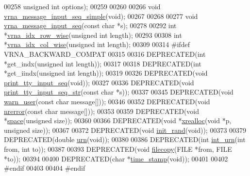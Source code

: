 \begin{DoxyCode}
00258                             \textcolor{keywordtype}{unsigned} \textcolor{keywordtype}{int} options);
00259 
00260 
00266 \textcolor{keywordtype}{void} \hyperlink{group__utils_gaee1dd652ca5b9e56b096963a1576f73b}{vrna\_message\_input\_seq\_simple}(\textcolor{keywordtype}{void});
00267 
00268 
00277 \textcolor{keywordtype}{void} \hyperlink{group__utils_gaf4d194d558b0c975f269de01dea52460}{vrna\_message\_input\_seq}(\textcolor{keyword}{const} \textcolor{keywordtype}{char} *s);
00278 
00292 \textcolor{keywordtype}{int} *\hyperlink{group__utils_ga70b180e9ea764218a82647a1cd347445}{vrna\_idx\_row\_wise}(\textcolor{keywordtype}{unsigned} \textcolor{keywordtype}{int} length);
00293 
00308 \textcolor{keywordtype}{int} *\hyperlink{group__utils_ga89ebc69c52fa0c78c9e1974b0017746b}{vrna\_idx\_col\_wise}(\textcolor{keywordtype}{unsigned} \textcolor{keywordtype}{int} length);
00309 
00314 \textcolor{preprocessor}{#ifdef  VRNA\_BACKWARD\_COMPAT}
00315 
00316 DEPRECATED(\textcolor{keywordtype}{int}   *get\_indx(\textcolor{keywordtype}{unsigned} \textcolor{keywordtype}{int} length));
00317 
00318 DEPRECATED(\textcolor{keywordtype}{int}   *get\_iindx(\textcolor{keywordtype}{unsigned} \textcolor{keywordtype}{int} length));
00319 
00326 DEPRECATED(\textcolor{keywordtype}{void} \hyperlink{utils_8h_a6bf778117d31b7fd90db435323f4ef74}{print\_tty\_input\_seq}(\textcolor{keywordtype}{void}));
00327 
00336 DEPRECATED(\textcolor{keywordtype}{void} \hyperlink{utils_8h_ae4ef89b662a3e9b5b5f0781d9757aba0}{print\_tty\_input\_seq\_str}(\textcolor{keyword}{const} \textcolor{keywordtype}{char} *s));
00337 
00345 DEPRECATED(\textcolor{keywordtype}{void} \hyperlink{utils_8h_af2355fa8746f2f30fbe71db65dea3d51}{warn\_user}(\textcolor{keyword}{const} \textcolor{keywordtype}{char} message[]));
00346 
00352 DEPRECATED(\textcolor{keywordtype}{void} \hyperlink{utils_8h_a127ce946e56b5a5773781cabe68e38c5}{nrerror}(\textcolor{keyword}{const} \textcolor{keywordtype}{char} message[]));
00353 
00359 DEPRECATED(\textcolor{keywordtype}{void} *\hyperlink{utils_8h_ad7e1e137b3bf1f7108933d302a7f0177}{space}(\textcolor{keywordtype}{unsigned} size));
00360 
00366 DEPRECATED(\textcolor{keywordtype}{void} *\hyperlink{utils_8h_a9037ada838835b1b9db41581a021b0c8}{xrealloc}(\textcolor{keywordtype}{void} *p, \textcolor{keywordtype}{unsigned} size));
00367 
00372 DEPRECATED(\textcolor{keywordtype}{void} \hyperlink{utils_8h_a8aaa6d9be6f803f496d9b97375c371f3}{init\_rand}(\textcolor{keywordtype}{void}));
00373 
00379 DEPRECATED(\textcolor{keywordtype}{double} \hyperlink{utils_8h_aaa328491c84996e445d027fde9800f2e}{urn}(\textcolor{keywordtype}{void}));
00380 
00386 DEPRECATED(\textcolor{keywordtype}{int} \hyperlink{utils_8h_a68ff0849d44f62fe491800378a5ffcb4}{int\_urn}(\textcolor{keywordtype}{int} from, \textcolor{keywordtype}{int} to));
00387 
00393 DEPRECATED(\textcolor{keywordtype}{void} \hyperlink{utils_8h_ab213334ce977b6d21611cdea6b80c3bf}{filecopy}(FILE *from, FILE *to));
00394 
00400 DEPRECATED(\textcolor{keywordtype}{char} *\hyperlink{utils_8h_a7afeb906cb36e9d77379eabc6907ac46}{time\_stamp}(\textcolor{keywordtype}{void}));
00401 
00402 \textcolor{preprocessor}{#endif}
00403 
00404 \textcolor{preprocessor}{#endif}
\end{DoxyCode}
